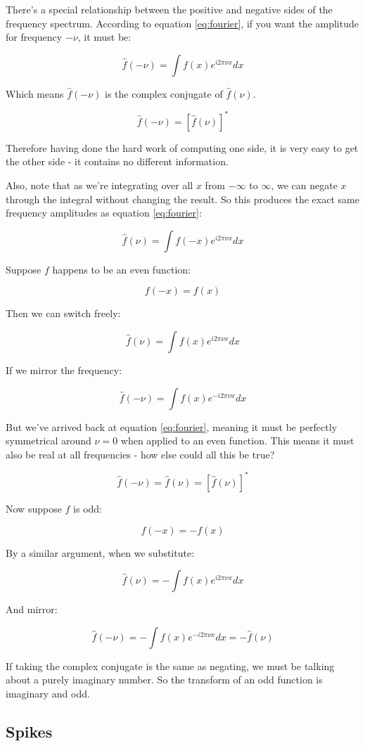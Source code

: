 There's a special relationship between the positive and negative sides of the frequency spectrum. According to equation \eqref{eq:fourier}, if you want the amplitude for frequency $-\nu$, it must be:

$$
\hat{f}(-\nu) = \int f(x)e^{i2\pi\nu x} dx
\label{3}
$$

Which means $\hat{f}(-\nu)$ is the complex conjugate of $\hat{f}(\nu)$.

$$
\hat{f}(-\nu) = \left[ \hat{f}(\nu) \right]^*
$$

Therefore having done the hard work of computing one side, it is very easy to get the other side - it contains no different information.

Also, note that as we're integrating over all $x$ from $-\infty$ to $\infty$, we can negate $x$ through the integral without changing the result. So this produces the exact same frequency amplitudes as equation \eqref{eq:fourier}:

$$\hat{f}(\nu) = \int f(-x)e^{i2\pi\nu x} dx$$

Suppose $f$ happens to be an even function:

$$f(-x) = f(x)$$

Then we can switch freely:

$$\hat{f}(\nu) = \int f(x)e^{i2\pi\nu x} dx$$

If we mirror the frequency:

$$\hat{f}(-\nu) = \int f(x)e^{-i2\pi\nu x} dx$$

But we've arrived back at equation \eqref{eq:fourier}, meaning it must be perfectly symmetrical around $\nu = 0$ when applied to an even function. This means it must also be real at all frequencies - how else could all this be true?

$$
\hat{f}(-\nu) = \hat{f}(\nu) = \left[ \hat{f}(\nu) \right]^*
$$

Now suppose $f$ is odd:

$$f(-x) = -f(x)$$

By a similar argument, when we substitute:

$$
\hat{f}(\nu) = - \int f(x)e^{i2\pi\nu x}
dx
$$

And mirror:

$$
\hat{f}(-\nu) = - \int f(x)e^{-i2\pi\nu x}
dx
= -\hat{f}(\nu)
$$

If taking the complex conjugate is the same as negating, we must be talking about a purely imaginary number. So the transform of an odd function is imaginary and odd.

\subsection{Spikes} \label{sec:fourier-spike}


